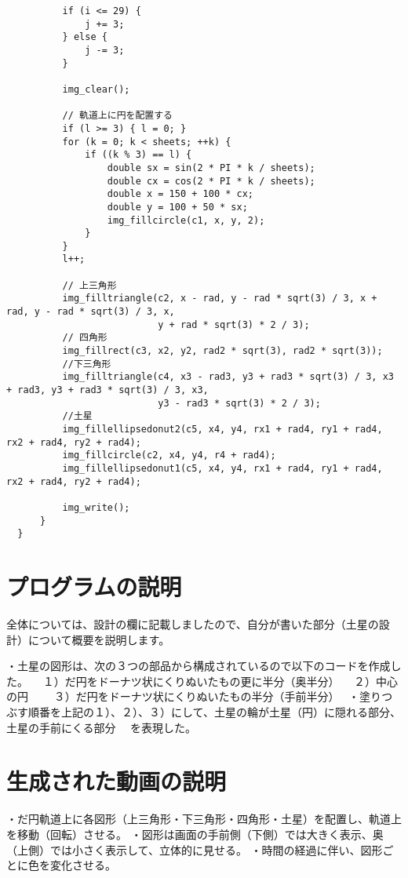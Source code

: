 \documentclass[12pt,a4j]{jarticle}
\begin{document}
\begin{verbatim}
          if (i <= 29) {
              j += 3;
          } else {
              j -= 3;
          }

          img_clear();

          // 軌道上に円を配置する
          if (l >= 3) { l = 0; }
          for (k = 0; k < sheets; ++k) {
              if ((k % 3) == l) {
                  double sx = sin(2 * PI * k / sheets);
                  double cx = cos(2 * PI * k / sheets);
                  double x = 150 + 100 * cx;
                  double y = 100 + 50 * sx;
                  img_fillcircle(c1, x, y, 2);
              }
          }
          l++;

          // 上三角形
          img_filltriangle(c2, x - rad, y - rad * sqrt(3) / 3, x + rad, y - rad * sqrt(3) / 3, x,
                           y + rad * sqrt(3) * 2 / 3);
          // 四角形
          img_fillrect(c3, x2, y2, rad2 * sqrt(3), rad2 * sqrt(3));
          //下三角形
          img_filltriangle(c4, x3 - rad3, y3 + rad3 * sqrt(3) / 3, x3 + rad3, y3 + rad3 * sqrt(3) / 3, x3,
                           y3 - rad3 * sqrt(3) * 2 / 3);
          //土星
          img_fillellipsedonut2(c5, x4, y4, rx1 + rad4, ry1 + rad4, rx2 + rad4, ry2 + rad4);
          img_fillcircle(c2, x4, y4, r4 + rad4);
          img_fillellipsedonut1(c5, x4, y4, rx1 + rad4, ry1 + rad4, rx2 + rad4, ry2 + rad4);

          img_write();
      }
  }

\end{verbatim}

\section{プログラムの説明}

全体については、設計の欄に記載しましたので、自分が書いた部分（土星の設計）について概要を説明します。

・土星の図形は、次の３つの部品から構成されているので以下のコードを作成した。
　１）だ円をドーナツ状にくりぬいたもの更に半分（奥半分）
　２）中心の円　
　３）だ円をドーナツ状にくりぬいたもの半分（手前半分）　
・塗りつぶす順番を上記の１）、２）、３）にして、土星の輪が土星（円）に隠れる部分、土星の手前にくる部分
　を表現した。

\section{生成された動画の説明}

・だ円軌道上に各図形（上三角形・下三角形・四角形・土星）を配置し、軌道上を移動（回転）させる。
・図形は画面の手前側（下側）では大きく表示、奥（上側）では小さく表示して、立体的に見せる。
・時間の経過に伴い、図形ごとに色を変化させる。
\end{document}
